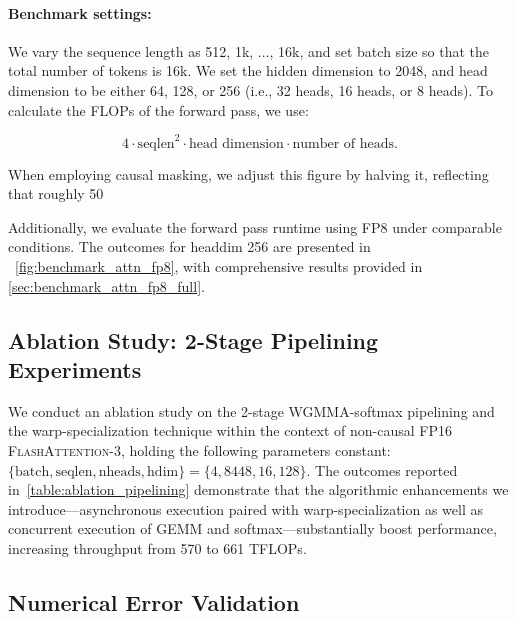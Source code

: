 \paragraph{Benchmark settings:} We vary the sequence length as 512, 1k, ..., 16k, and set batch size so that the total number of tokens is 16k. We set the hidden dimension to 2048, and head dimension to be either 64, 128, or 256 (i.e., 32 heads, 16 heads, or 8 heads). To calculate the FLOPs of the forward pass, we use:

\begin{equation*}
  4 \cdot \text{seqlen}^2 \cdot \text{head dimension} \cdot \text{number of heads}.
\end{equation*}

When employing causal masking, we adjust this figure by halving it, reflecting that roughly 50%

Additionally, we evaluate the forward pass runtime using FP8 under comparable conditions. The outcomes for headdim 256 are presented in ~\cref{fig:benchmark_attn_fp8}, with comprehensive results provided in \cref{sec:benchmark_attn_fp8_full}.

\subsection{Ablation Study: 2-Stage Pipelining Experiments}
\label{sec:2-stage-pipelining-experiments}

We conduct an ablation study on the 2-stage WGMMA-softmax pipelining and the warp-specialization technique within the context of non-causal FP16 \textsc{FlashAttention-3}, holding the following parameters constant: $\{\text{batch}, \text{seqlen}, \text{nheads}, \text{hdim}\} = \{ 4, 8448, 16, 128\}$. 
The outcomes reported in~\cref{table:ablation_pipelining} demonstrate that the algorithmic enhancements we introduce—asynchronous execution paired with warp-specialization as well as concurrent execution of GEMM and softmax—substantially boost performance, increasing throughput from 570 to 661 TFLOPs.

\subsection{Numerical Error Validation}
\label{sec:numerical_error}

